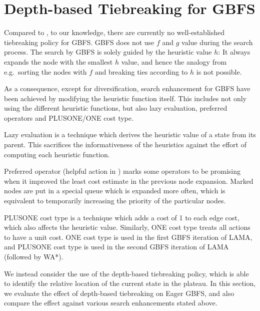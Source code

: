 \section{Depth-based Tiebreaking for GBFS}

% 
% 


Compared to \astar, to our knowledge, there are currently no
well-established tiebreaking policy for GBFS. GBFS does not use $f$ and
$g$ value during the search process.  The search by GBFS is solely
guided by the heuristic value $h$: It always expands the node with the
smallest $h$ value, and hence the analogy from \astar e.g.\ sorting the
nodes with $f$ and breaking ties according to $h$ is not possible.

As a consequence, except for diversification,
search enhancement for GBFS have been achieved by
modifying the heuristic function itself.  This includes not only using the
different heuristic functions, but also lazy evaluation,
preferred operators and PLUSONE/ONE cost type.
 
Lazy evaluation is a technique which derives the heuristic value of a
state from its parent. This sacrifices the informativeness of the
heuristics against the effort of computing each heuristic function.
 
Preferred operator (helpful action in \cite{Hoffmann01}) marks some
operators to be promising when it improved the least cost estimate in the
previous node expansion. Marked nodes are put in a special queue
which is expanded more often, which is equivalent to temporarily
increasing the priority of the particular nodes.
 
PLUSONE cost type is a technique which adds a cost of 1 to each edge
cost, which also affects the heuristic value. Similarly, ONE cost type
treats all actions to have a unit cost.  ONE cost type is used in
the first GBFS iteration of LAMA, and PLUSONE cost type is used in the
second GBFS iteration of LAMA (followed by WA*).

We instead consider the use of the depth-based tiebreaking policy, which
is able to identify the relative location of the current state in the
plateau.  In this section, we evaluate the effect of depth-based
tiebreaking on Eager GBFS, and also compare the effect
against various search enhancements stated above.

